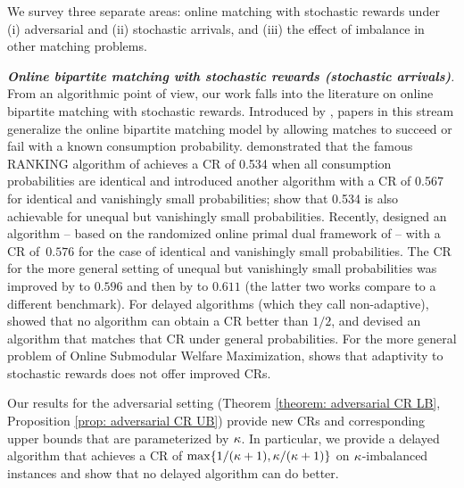 {
We survey three separate areas: online matching with stochastic rewards under (i) adversarial and (ii) stochastic arrivals, and (iii) the effect of imbalance in other matching problems.

\emph{\textbf{Online bipartite matching with stochastic rewards (stochastic arrivals)}.}  From an algorithmic point of view, our work falls into the literature on online bipartite matching with stochastic rewards. Introduced by \citet{mehta2012online}, papers in this stream generalize the online bipartite matching model \citep{karp1990optimal} by allowing matches to succeed or fail with a known consumption probability. \citet{mehta2012online} demonstrated that the famous RANKING algorithm of \citet{karp1990optimal} achieves a CR of 0.534 when all consumption probabilities are identical and introduced another algorithm with a CR of 0.567 for identical and vanishingly small probabilities; \citet{mehta2014online} show that 0.534 is also achievable for unequal but vanishingly small probabilities. Recently, \citet{huang2020online} designed an algorithm -- based on the randomized online primal dual framework of \citet{devanur2013randomized} -- with a CR of~$0.576$ for the case of identical and vanishingly small probabilities. The CR for the more general setting of unequal but vanishingly small probabilities was improved by \citet{goyal2023online} to $0.596$ and then by \citet{huang2023online} to  $0.611$ (the latter two works compare to a different benchmark).  For delayed algorithms (which they call non-adaptive), \citet{mehta2012online} showed that no algorithm can obtain a CR better than $1/2$, and \citet{mehta2014online} devised an algorithm that matches that CR under general probabilities. {For the more general problem of Online Submodular Welfare Maximization, \citet{udwani2024online} shows that adaptivity to stochastic rewards does not offer improved CRs.} 

Our results for the adversarial setting (Theorem \ref{theorem: adversarial CR LB}, Proposition \ref{prop: adversarial CR UB}) provide new CRs and corresponding upper bounds that are parameterized by $\kappa$. In particular, we provide a delayed algorithm that achieves a CR of $\max\{1/(\kappa+1),\kappa/(\kappa+1)\}$ on $\kappa$-imbalanced instances and show that no delayed algorithm can do better.
}

